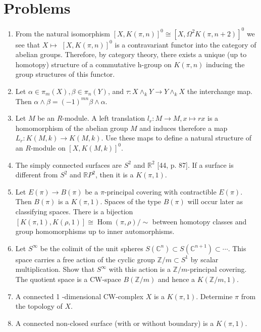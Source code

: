 \documentclass[10pt, letterpaper]{article}
\begin{document}
\section*{Problems}
\begin{enumerate}
  \item From the natural isomorphism $[X, K(\pi, n)]^{0} \cong\left[X, \Omega^{2} K(\pi, n+2)\right]^{0}$ we see that $X \mapsto$ $[X, K(\pi, n)]^{0}$ is a contravariant functor into the category of abelian groups. Therefore, by category theory, there exists a unique (up to homotopy) structure of a commutative h-group on $K(\pi, n)$ inducing the group structures of this functor.
  \item Let $\alpha \in \pi_{m}(X), \beta \in \pi_{n}(Y)$, and $\tau: X \wedge_{k} Y \rightarrow Y \wedge_{k} X$ the interchange map. Then $\alpha \wedge \beta=(-1)^{m n} \beta \wedge \alpha$.
  \item Let $M$ be an $R$-module. A left translation $l_{r}: M \rightarrow M, x \mapsto r x$ is a homomorphism of the abelian group $M$ and induces therefore a map $L_{r}: K(M, k) \rightarrow K(M, k)$. Use these maps to define a natural structure of an $R$-module on $[X, K(M, k)]^{0}$.
  \item The simply connected surfaces are $S^{2}$ and $\mathbb{R}^{2}$ [44, p. 87]. If a surface is different from $S^{2}$ and $\mathbb{R} P^{2}$, then it is a $K(\pi, 1)$.
  \item Let $E(\pi) \rightarrow B(\pi)$ be a $\pi$-principal covering with contractible $E(\pi)$. Then $B(\pi)$ is a $K(\pi, 1)$. Spaces of the type $B(\pi)$ will occur later as classifying spaces. There is a bijection $[K(\pi, 1), K(\rho, 1)] \cong \operatorname{Hom}(\pi, \rho) / \sim$ between homotopy classes and group homomorphisms up to inner automorphisms.
  \item Let $S^{\infty}$ be the colimit of the unit spheres $S\left(\mathbb{C}^{n}\right) \subset S\left(\mathbb{C}^{n+1}\right) \subset \cdots$. This space carries a free action of the cyclic group $\mathbb{Z} / m \subset S^{1}$ by scalar multiplication. Show that $S^{\infty}$ with this action is a $\mathbb{Z} / m$-principal covering. The quotient space is a CW-space $B(\mathbb{Z} / m)$ and hence a $K(\mathbb{Z} / m, 1)$.
  \item A connected 1 -dimensional CW-complex $X$ is a $K(\pi, 1)$. Determine $\pi$ from the topology of $X$.
  \item A connected non-closed surface (with or without boundary) is a $K(\pi, 1)$.
\end{enumerate}





\pagebreak
\printbibliography
\end{document}
